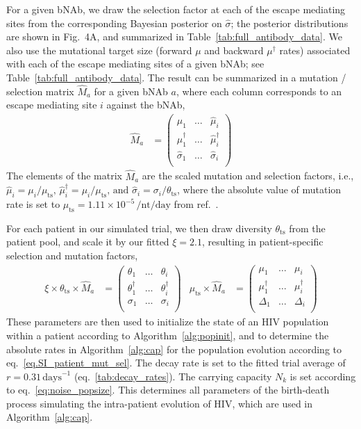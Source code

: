 \documentclass[11pt]{article}
\newcommand{\ts}{{\text{ts}}}
\begin{document}
For a given bNAb, we draw the selection factor at each of the escape mediating sites from the corresponding Bayesian posterior on $\hat{\sigma}$; the posterior distributions are shown in Fig.~4A, and summarized in Table~\ref{tab:full_antibody_data}. We also use the mutational target size  (forward $\mu$ and backward $\mu^\dagger$ rates) associated with each of the escape mediating sites of a given bNAb; see Table~\ref{tab:full_antibody_data}. The result can be summarized in a  mutation / selection matrix  $\hat{M}_a$ for a given bNAb $a$, where each column corresponds to an escape mediating site $i$ against the bNAb,
\begin{align}
\hat{M}_a &= \begin{pmatrix}
\hat{\mu}_1 &\hdots& \hat{\mu}_i\\
\hat{\mu}_1^\dagger & \hdots & \hat{\mu}_i^\dagger\\
\hat{\sigma}_1 &\hdots  & \hat{\sigma}_i\\
\end{pmatrix}
\end{align}
The elements of the matrix $\hat{M}_a$ are the scaled mutation and selection factors, i.e., $\hat{\mu}_i = \mu_i/\mu_\ts,\, \hat{\mu}^\dagger_i = \mu_i/\mu_\ts,\, \text{and } \hat\sigma_i = \sigma_i/\theta_\ts$, where the absolute value of mutation rate is set to  $\mu_{\ts}= 1.11 \times 10^{-5}\, /\text{nt}/\text{day}$ from ref.~\cite{Zanini:2017in}.

For each patient in our simulated trial, we then draw diversity  $\theta_{\ts}$ from the patient pool, and scale it by our fitted $\xi = 2.1$, resulting in patient-specific selection and mutation factors,
\begin{align}
\xi \times \theta_{\ts} \times  \hat{M}_a &= 
\begin{pmatrix}
{\theta}_1 &\hdots& {\theta}_i\\
{\theta}_1^\dagger & \hdots & {\theta}_i^\dagger\\
{\sigma}_1 &\hdots  & {\sigma}_i\\
\end{pmatrix} &
	\mu_{\ts} \times  \hat{M}_a &= 
\begin{pmatrix}
{\mu}_1 &\hdots& {\mu}_i\\
{\mu}_1^\dagger & \hdots & {\mu}_i^\dagger\\
{\Delta}_1 &\hdots  & {\Delta}_i\\
\end{pmatrix} 
\label{eq.SI_patient_mut_sel}
\end{align}
These parameters are then used to initialize the state of an HIV population within a patient according to Algorithm~\ref{alg:popinit}, and to determine the absolute rates in Algorithm~\ref{alg:cap} for the population evolution according to eq.~\ref{eq.SI_patient_mut_sel}. The decay rate is set to the fitted trial average of $r=0.31 \, \text{days}^{-1}$ (eq.~\ref{tab:decay_rates}).  The carrying capacity $N_k$ is set according to eq.~\ref{eq:noise_popsize}. This determines all parameters of the  birth-death process simulating the intra-patient evolution of HIV, which are used in Algorithm~\ref{alg:cap}.
\end{document}
